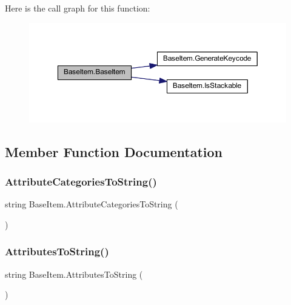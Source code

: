 Here is the call graph for this function\+:\nopagebreak
\begin{figure}[H]
\begin{center}
\leavevmode
\includegraphics[width=350pt]{class_base_item_a4faa2410aa193b87718cc3ed337c0766_cgraph}
\end{center}
\end{figure}


\subsection{Member Function Documentation}
\mbox{\label{class_base_item_ac92f27fa7357e9cb20c62704ecca021a}} 
\subsubsection{\texorpdfstring{AttributeCategoriesToString()}{AttributeCategoriesToString()}}
{\footnotesize\ttfamily string Base\+Item.\+Attribute\+Categories\+To\+String (\begin{DoxyParamCaption}{ }\end{DoxyParamCaption})}

\mbox{\label{class_base_item_afd59d6b5168af724211f54ad3692ea73}} 
\subsubsection{\texorpdfstring{AttributesToString()}{AttributesToString()}}
{\footnotesize\ttfamily string Base\+Item.\+Attributes\+To\+String (\begin{DoxyParamCaption}{ }\end{DoxyParamCaption})}

